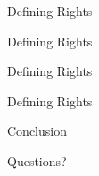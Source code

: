 \documentclass{beamer}
\begin{document}
\begin{frame}[fragile]{Defining Rights}
\end{frame}
\begin{frame}[fragile]{Defining Rights}
\end{frame}
\begin{frame}[fragile]{Defining Rights}
\end{frame}
\begin{frame}[fragile]{Defining Rights}
\end{frame}
\begin{frame}[fragile]{Conclusion}
\end{frame}
\begin{frame}[fragile]{Questions?}
\end{frame}
\end{document}
